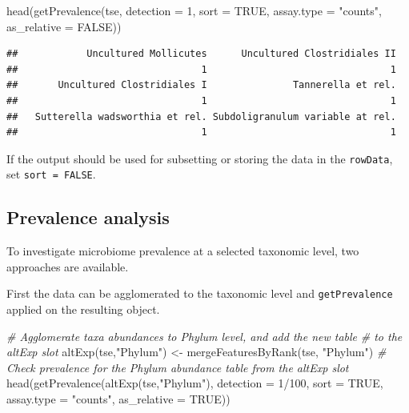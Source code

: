 \documentclass[
]{book}
\newenvironment{Shaded}{\begin{snugshade}}{\end{snugshade}}
\newcommand{\AttributeTok}[1]{\textcolor[rgb]{0.77,0.63,0.00}{#1}}
\newcommand{\CommentTok}[1]{\textcolor[rgb]{0.56,0.35,0.01}{\textit{#1}}}
\newcommand{\ConstantTok}[1]{\textcolor[rgb]{0.00,0.00,0.00}{#1}}
\newcommand{\DecValTok}[1]{\textcolor[rgb]{0.00,0.00,0.81}{#1}}
\newcommand{\FunctionTok}[1]{\textcolor[rgb]{0.00,0.00,0.00}{#1}}
\newcommand{\NormalTok}[1]{#1}
\newcommand{\OtherTok}[1]{\textcolor[rgb]{0.56,0.35,0.01}{#1}}
\newcommand{\SpecialCharTok}[1]{\textcolor[rgb]{0.00,0.00,0.00}{#1}}
\newcommand{\StringTok}[1]{\textcolor[rgb]{0.31,0.60,0.02}{#1}}
\begin{document}
\begin{Shaded}
\begin{Highlighting}[]
\FunctionTok{head}\NormalTok{(}\FunctionTok{getPrevalence}\NormalTok{(tse, }\AttributeTok{detection =} \DecValTok{1}\NormalTok{, }\AttributeTok{sort =} \ConstantTok{TRUE}\NormalTok{, }\AttributeTok{assay.type =} \StringTok{"counts"}\NormalTok{,}
                   \AttributeTok{as\_relative =} \ConstantTok{FALSE}\NormalTok{))}
\end{Highlighting}
\end{Shaded}

\begin{verbatim}
##            Uncultured Mollicutes      Uncultured Clostridiales II 
##                                1                                1 
##       Uncultured Clostridiales I               Tannerella et rel. 
##                                1                                1 
##   Sutterella wadsworthia et rel. Subdoligranulum variable at rel. 
##                                1                                1
\end{verbatim}

If the output should be used for subsetting or storing the data in the
\texttt{rowData}, set \texttt{sort\ =\ FALSE}.

\hypertarget{prevalence-analysis}{%
\subsection{Prevalence analysis}\label{prevalence-analysis}}

To investigate microbiome prevalence at a selected taxonomic level, two
approaches are available.

First the data can be agglomerated to the taxonomic level and \texttt{getPrevalence}
applied on the resulting object.

\begin{Shaded}
\begin{Highlighting}[]
\CommentTok{\# Agglomerate taxa abundances to Phylum level, and add the new table}
\CommentTok{\# to the altExp slot}
\FunctionTok{altExp}\NormalTok{(tse,}\StringTok{"Phylum"}\NormalTok{) }\OtherTok{\textless{}{-}} \FunctionTok{mergeFeaturesByRank}\NormalTok{(tse, }\StringTok{"Phylum"}\NormalTok{)}
\CommentTok{\# Check prevalence for the Phylum abundance table from the altExp slot}
\FunctionTok{head}\NormalTok{(}\FunctionTok{getPrevalence}\NormalTok{(}\FunctionTok{altExp}\NormalTok{(tse,}\StringTok{"Phylum"}\NormalTok{), }\AttributeTok{detection =} \DecValTok{1}\SpecialCharTok{/}\DecValTok{100}\NormalTok{, }\AttributeTok{sort =} \ConstantTok{TRUE}\NormalTok{,}
                   \AttributeTok{assay.type =} \StringTok{"counts"}\NormalTok{, }\AttributeTok{as\_relative =} \ConstantTok{TRUE}\NormalTok{))}
\end{Highlighting}
\end{Shaded}
\end{document}
